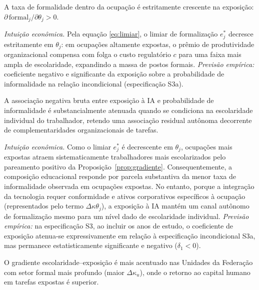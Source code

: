 \begin{proposicao}
\label{prop:formalidade}
A taxa de formalidade dentro da ocupação é estritamente crescente na exposição: $\partial \, \text{formal}_j / \partial \theta_j > 0$.
\end{proposicao}

\textit{Intuição econômica.} Pela equação \eqref{eq:limiar}, o limiar de formalização $e^*_j$ decresce estritamente em $\theta_j$: em ocupações altamente expostas, o prêmio de produtividade organizacional compensa com folga o custo regulatório $c$ para uma faixa mais ampla de escolaridade, expandindo a massa de postos formais. \emph{Previsão empírica:} coeficiente negativo e significante da exposição sobre a probabilidade de informalidade na relação incondicional (especificação S3a).

\begin{corolario}
\label{cor:mediacao}
A associação negativa bruta entre exposição à IA e probabilidade de informalidade é substancialmente atenuada quando se condiciona na escolaridade individual do trabalhador, retendo uma associação residual autônoma decorrente de complementaridades organizacionais de tarefas.
\end{corolario}

\textit{Intuição econômica.} Como o limiar $e_j^*$ é decrescente em $\theta_j$, ocupações mais expostas atraem sistematicamente trabalhadores mais escolarizados pelo pareamento positivo da Proposição~\ref{prop:gradiente}. Consequentemente, a composição educacional responde por parcela substantiva da menor taxa de informalidade observada em ocupações expostas. No entanto, porque a integração da tecnologia requer conformidade e ativos corporativos específicos à ocupação (representados pelo termo $\Delta\kappa \theta_j$), a exposição à IA mantém um canal autônomo de formalização mesmo para um nível dado de escolaridade individual. \emph{Previsão empírica:} na especificação S3, ao incluir os anos de estudo, o coeficiente de exposição atenua-se expressivamente em relação à especificação incondicional S3a, mas permanece estatisticamente significante e negativo ($\delta_1 < 0$).

\begin{proposicao}
\label{prop:regiao}
O gradiente escolaridade--exposição é mais acentuado nas Unidades da Federação com setor formal mais profundo (maior $\Delta\kappa_u$), onde o retorno ao capital humano em tarefas expostas é superior.
\end{proposicao}

